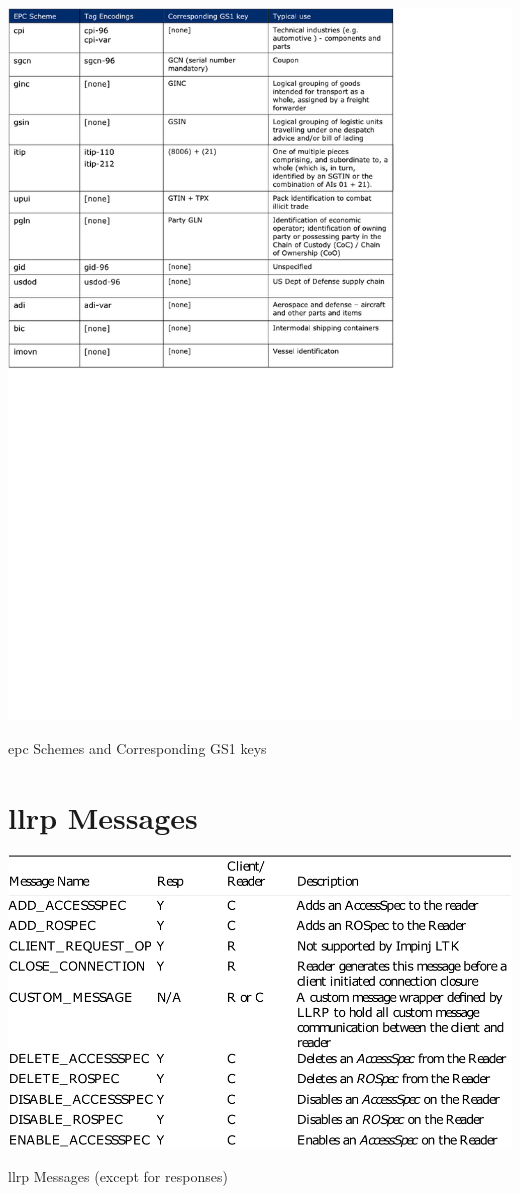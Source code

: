 \begin{appendices}
\begin{table}
    \centering
    \includegraphics[width=\textwidth]{./figs/02-state-of-the-art/epcschemes2.pdf}
    \caption{\ac{epc} Schemes and Corresponding GS1 keys~\cite{EPCTagData}}
\end{table}

\section{\ac{llrp} Messages} \label{anx:llrpmessages}
\begin{table}
    \centering
    \includegraphics[width=\textwidth]{./figs/02-state-of-the-art/table_llrpmessages_1.pdf}
    \caption{\ac{llrp} Messages (except for responses)~\cite{ImpinjLTKProgrammers}} 
    \label{tab:llrpmessages1}
\end{table}


\end{appendices}
